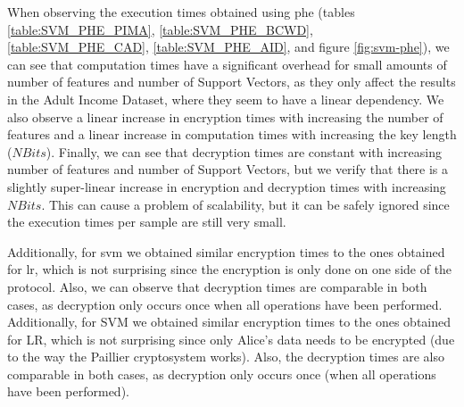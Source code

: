 When observing the execution times obtained using \ac{phe} (tables \ref{table:SVM_PHE_PIMA}, \ref{table:SVM_PHE_BCWD}, \ref{table:SVM_PHE_CAD}, \ref{table:SVM_PHE_AID}, and figure \ref{fig:svm-phe}), we can see that computation times have a significant overhead for small amounts of number of features and number of Support Vectors, as they only affect the results in the Adult Income Dataset, where they seem to have a linear dependency. 
We also observe a linear increase in encryption times with increasing the number of features and a linear increase in computation times with increasing the key length ($NBits$).
Finally, we can see that decryption times are constant with increasing number of features and number of Support Vectors, but we verify that there is a slightly super-linear increase in encryption and decryption times with increasing $NBits$. This can cause a problem of scalability, but it can be safely ignored since the execution times per sample are still very small.

Additionally, for \ac{svm} we obtained similar encryption times to the ones obtained for \ac{lr}, which is not surprising since the encryption is only done on one side of the protocol. Also, we can observe that decryption times are comparable in both cases, as decryption only occurs once when all operations have been performed.
Additionally, for SVM we obtained similar encryption times to the ones obtained for LR, which is not surprising since only Alice’s data needs to be encrypted (due to the way the Paillier cryptosystem works). Also, the decryption times are also comparable in both cases, as decryption only occurs once (when all operations have been performed).


